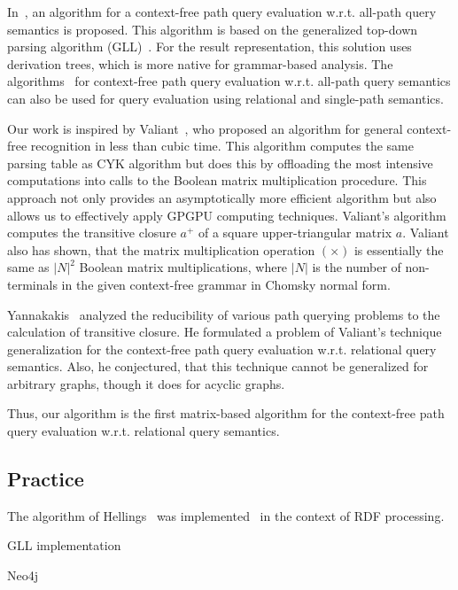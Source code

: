 In~\cite{GLL}, an algorithm for a context-free path query evaluation w.r.t. all-path query semantics is proposed. This algorithm is based on the generalized top-down parsing algorithm (GLL)~\cite{scott2010gll}. For the result representation, this solution uses derivation trees, which is more native for grammar-based analysis. The algorithms~\cite{GLL,hellingsPathQuerying} for context-free path query evaluation w.r.t. all-path query semantics can also be used for query evaluation using relational and single-path semantics.

Our work is inspired by Valiant~\cite{valiant}, who proposed an algorithm for general context-free recognition in less than cubic time. This algorithm computes the same parsing table as CYK algorithm but does this by offloading the most intensive computations into calls to the Boolean matrix multiplication procedure. This approach not only provides an asymptotically more efficient algorithm but also allows us to effectively apply GPGPU computing techniques. Valiant's algorithm computes the transitive closure $a^+$ of a square upper-triangular matrix $a$. Valiant also has shown, that the matrix multiplication operation $(\times)$ is essentially the same as $|N|^2$ Boolean matrix multiplications, where $|N|$ is the number of non-terminals in the given context-free grammar in Chomsky normal form.

Yannakakis~\cite{transitive-closure} analyzed the reducibility of various path querying problems to the calculation of transitive closure. He formulated a problem of Valiant's technique generalization for the context-free path query evaluation w.r.t. relational query semantics. Also, he conjectured, that this technique cannot be generalized for arbitrary graphs, though it does for acyclic graphs.

Thus, our algorithm is the first matrix-based algorithm for the context-free path query evaluation w.r.t. relational query semantics.
\subsection{Practice}



The algorithm of Hellings~\cite{hellingsRelational} was implemented~\cite{RDF} in the context of RDF processing.

GLL implementation

Neo4j




